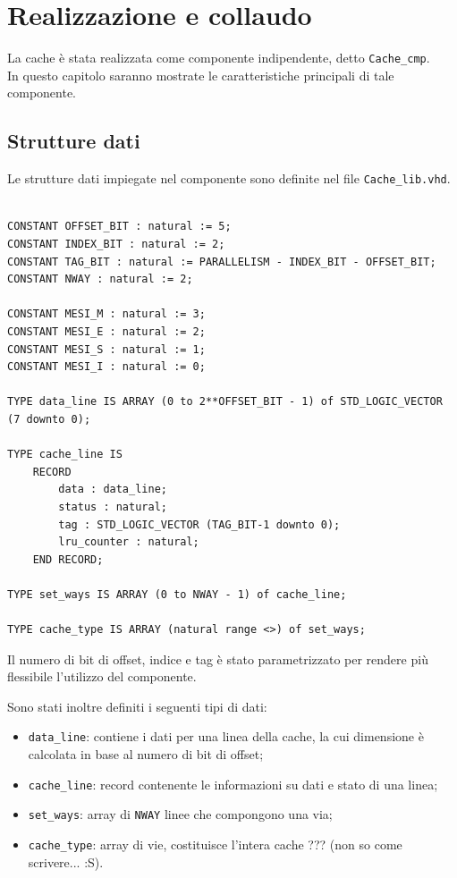 \clearpage{\pagestyle{empty}\cleardoublepage}

\chapter{Realizzazione e collaudo}

La cache \`e stata realizzata come componente indipendente, detto \texttt{Cache\_cmp}.\\
In questo capitolo saranno mostrate le caratteristiche principali di tale componente.

\section{Strutture dati}

Le strutture dati impiegate nel componente sono definite nel file \texttt{Cache\_lib.vhd}.


\begin{lstlisting}

CONSTANT OFFSET_BIT : natural := 5;
CONSTANT INDEX_BIT : natural := 2;
CONSTANT TAG_BIT : natural := PARALLELISM - INDEX_BIT - OFFSET_BIT;
CONSTANT NWAY : natural := 2;

CONSTANT MESI_M : natural := 3;
CONSTANT MESI_E : natural := 2;
CONSTANT MESI_S : natural := 1;
CONSTANT MESI_I : natural := 0;

TYPE data_line IS ARRAY (0 to 2**OFFSET_BIT - 1) of STD_LOGIC_VECTOR (7 downto 0);

TYPE cache_line IS 
	RECORD
		data : data_line;
		status : natural;
		tag : STD_LOGIC_VECTOR (TAG_BIT-1 downto 0);
		lru_counter : natural;
	END RECORD;

TYPE set_ways IS ARRAY (0 to NWAY - 1) of cache_line;
		
TYPE cache_type IS ARRAY (natural range <>) of set_ways;
\end{lstlisting}


Il numero di bit di offset, indice e tag \`e stato parametrizzato per rendere pi\`u flessibile l'utilizzo del componente.

Sono stati inoltre definiti i seguenti tipi di dati:
\begin{itemize}
  \item \texttt{data\_line}: contiene i dati per una linea della cache, la cui dimensione \`e calcolata in base al numero di bit di offset;
  \item \texttt{cache\_line}: record contenente le informazioni su dati e stato di una linea;
  \item \texttt{set\_ways}: array di \texttt{NWAY} linee che compongono una via;
  \item \texttt{cache\_type}: array di vie, costituisce l'intera cache ??? (non so come scrivere... :S).
\end{itemize}

